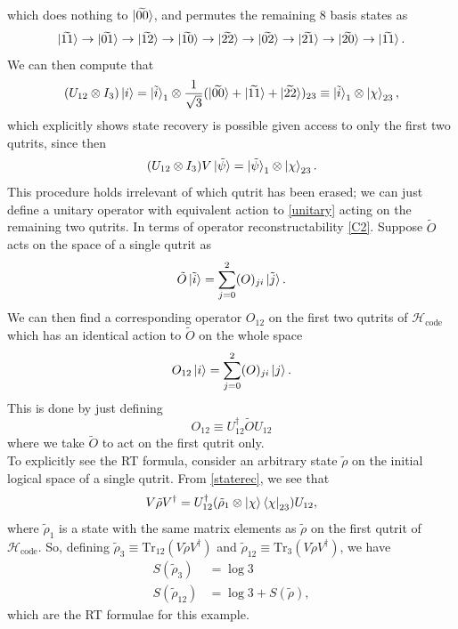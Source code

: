 \documentclass[12pt,a4paper]{report}
\numberwithin{equation}{section}
\newcommand{\ketbra}[2]{\ket{#1}\bra{#2}}
\newcommand{\ketbras}[1]{\ketbra{#1}{#1}}
\newcommand{\Hcode}{\mathcal{H}_{\text{code}}}
\newcommand{\tr}{\text{Tr}}
\theoremstyle{definition}
\theoremstyle{theorem}
\theoremstyle{theorem}
\theoremstyle{example}
\theoremstyle{definition}
\begin{document}
which does nothing to $\ket{\widetilde{00}}$, and permutes the remaining 8 basis states as
\begin{equation}
	\ket{\widetilde{11}}\to\ket{\widetilde{01}}\to\ket{\widetilde{12}}\to\ket{\widetilde{10}}\to\ket{\widetilde{22}}\to\ket{\widetilde{02}}\to\ket{\widetilde{21}}\to\ket{\widetilde{20}}\to\ket{\widetilde{11}}.
\end{equation}
We can then compute that
\begin{equation}
	(U_{12}\otimes I_{3})\ket{i}=\ket{\tilde{i}}_{1}\otimes\frac{1}{\sqrt{3}}(\ket{\widetilde{00}}+\ket{\widetilde{11}}+\ket{\widetilde{22}})_{23}\equiv\ket{\tilde{i}}_{1}\otimes\ket{\chi}_{23},
\end{equation}
which explicitly shows state recovery is possible given access to only the first two qutrits, since then
\begin{equation}\label{staterec}
	(U_{12}\otimes I_{3})V\ket{\tilde{\psi}}=\ket{\tilde{\psi}}_{1}\otimes\ket{\chi}_{23}.
\end{equation}
This procedure holds irrelevant of which qutrit has been erased; we can just define a unitary operator with equivalent action to \ref{unitary} acting on the remaining two qutrits. In terms of operator reconstructability \ref{C2}. Suppose $\tilde{O}$ acts on the space of a single qutrit as
\begin{equation}
	\tilde{O}\ket{\tilde{i}}=\sum_{j=0}^{2}(O)_{ji}\ket{\tilde{j}}.
\end{equation}
We can then find a corresponding operator $O_{12}$ on the first two qutrits of $\Hcode$ which has an identical action to $\tilde{O}$ on the whole space
\begin{equation}
	O_{12}\ket{i}=\sum_{j=0}^{2}(O)_{ji}\ket{j}.
\end{equation}
This is done by just defining
\begin{equation}
	O_{12}\equiv U_{12}^{\dagger}\tilde{O}U_{12}
\end{equation}
where we take $\tilde{O}$ to act on the first qutrit only.\\
To explicitly see the RT formula, consider an arbitrary state $\tilde{\rho}$ on the initial logical space of a single qutrit. From \ref{staterec}, we see that
\begin{equation}
	V\tilde{\rho}V^{\dagger}=U_{12}^{\dagger}(\tilde{\rho}_{1}\otimes\ketbras{\chi}_{23})U_{12},
\end{equation}
where $\tilde{\rho}_{1}$ is a state with the same matrix elements as $\tilde{\rho}$ on the first qutrit of $\Hcode$. So, defining $\tilde{\rho}_{3}\equiv\tr_{12}(V\tilde{\rho}V^{\dagger})$ and $\tilde{\rho}_{12}\equiv\tr_{3}(V\tilde{\rho}V^{\dagger})$, we have
\begin{equation}
	\begin{aligned}
		S(\tilde{\rho}_{3})&=\log{3}\\
		S(\tilde{\rho}_{12})&=\log{3}+S(\tilde{\rho}),
	\end{aligned}
\end{equation}
which are the RT formulae for this example.
\end{document}
